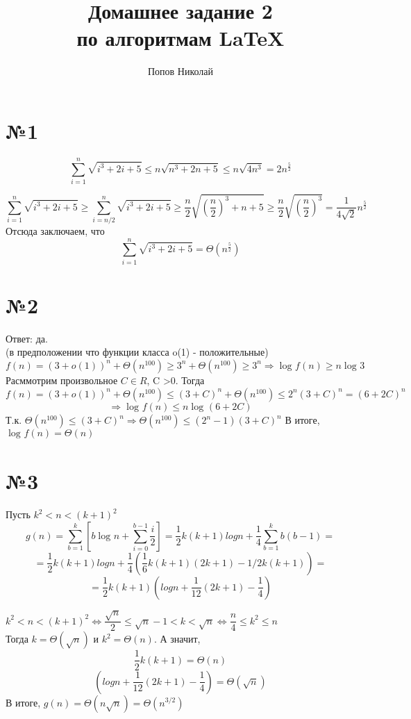 \documentclass[a4paper,12pt]{article} %
\author{Попов Николай}
\title{Домашнее задание 2\\ по алгоритмам \LaTeX{}}
\begin{document}

\maketitle 
\newpage 

\section*{№1}
\[\sum\limits_{i=1}^n \sqrt{i^{3}+2i+5}\leqslant n\sqrt{n^{3}+2n+5}\leqslant n\sqrt{4n^{3}}= 2n^{\frac{5}{2}}\]

\[\sum\limits_{i=1}^n \sqrt{i^{3}+2i+5}\geqslant \sum\limits_{i=n/2}^n \sqrt{i^{3}+2i+5}\geqslant \dfrac{n}{2}\sqrt{\left(\dfrac{n}{2}\right)^{3}+n+5}\geqslant  \dfrac{n}{2}\sqrt{\left(\dfrac{n}{2}\right)^{3}}  = \dfrac{1}{4\sqrt{2}}n^{\frac{5}{2}}\]
Отсюда заключаем, что 
\[\sum\limits_{i=1}^n \sqrt{i^{3}+2i+5}=\Theta(n^{\frac{5}{2}})
\]

\section*{№2}
Ответ: да.\\
(в предположении что функции класса o(1) - положительные)
\[f(n)=(3+o(1))^{n}+\Theta(n^{100})\geqslant 3^{n}+\Theta(n^{100}) \geqslant 3^{n} \Rightarrow \log_{}{f(n)} \geqslant n \log_{}{3}\]
Расммотрим произвольное $C\in R$, C >0. Тогда 
\[f(n) = (3+o(1))^{n}+\Theta(n^{100})\leqslant (3+C)^{n}+\Theta(n^{100}) \leqslant 2^{n}(3+C)^{n}=(6+2C)^{n}\]\[\Rightarrow \log_{}{f(n)} \leqslant n \log_{}{(6+2C)}\] 
Т.к. $\Theta(n^{100}) \leqslant (3+C)^{n}\Rightarrow\Theta(n^{100}) \leqslant (2^{n}-1)(3+C)^{n}$
В итоге, $\log_{}{f(n)}= \Theta(n)$

\section*{№3}
Пусть $k^{2} < n < (k+1)^{2}$\\
\[g(n)=\sum\limits_{b=1}^{k}\left[b \log_{}{n}+\sum\limits_{i=0}^{b-1}\dfrac{i}{2}\right]= \dfrac{1}{2}k(k+1)logn + \dfrac{1}{4}\sum\limits_{b=1}^{k}b(b-1) = \]
\[=\dfrac{1}{2}k(k+1)logn + \dfrac{1}{4}\left(\dfrac{1}{6}k(k+1)(2k+1) - 1/2k(k+1)\right)=\]
\[=\dfrac{1}{2}k(k+1)\left(logn + \dfrac{1}{12}(2k+1)-\dfrac{1}{4}\right)\]

 $k^{2} < n < (k+1)^{2}\Leftrightarrow \dfrac{\sqrt{n}}{2}\leqslant \sqrt{n}-1<k<\sqrt{n} \Leftrightarrow \dfrac{n}{4}\leqslant k^{2}\leqslant n$\\
Тогда $k=\Theta(\sqrt{n})$ и $k^{2}= \Theta(n) $.
А значит, 
\[\dfrac{1}{2}k(k+1) = \Theta(n)\]
\[\left(logn + \dfrac{1}{12}(2k+1)-\dfrac{1}{4}\right) = \Theta(\sqrt{n}) \]
В итоге, $g(n)=\Theta(n\sqrt{n})=\Theta(n^{3/2})$
\end{document}
